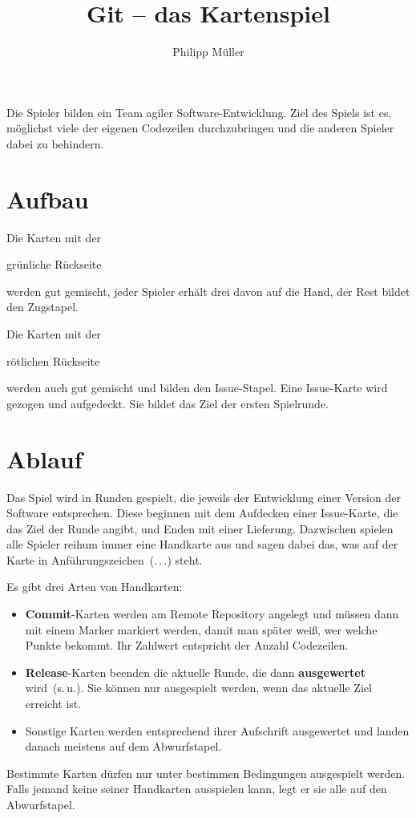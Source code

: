 \documentclass[DIV=15, fontsize=11pt]{scrartcl}
\title{Git -- das Kartenspiel}
\author{Philipp Müller}
\newcommand\hugefont[1]{\raisebox{-5pt}{\fontsize{50}{60}\sffamily\bfseries\selectfont #1}}
\newcommand\bigfont[1]{{\fontsize{20}{24}\sffamily\bfseries\selectfont #1}}
\newcommand\textfontsize[1]{\fontsize{9}{10}\sffamily\selectfont #1}
\newcommand\rede[1]{\glqq #1\grqq{}}
\newcommand\textrule[1]{\textbf{#1}}
\newenvironment{CardFront}[1]{%
  \global\advance\cardnum by 1%
  \begin{tikzpicture}
    \draw[line width=\cardlinewidth, rounded corners=\cardborderradius, fill=white] (0,0) rectangle (\cardwidth,\cardheight) coordinate (URex);

    \path (0,0)--(\cardwidth,\cardheight) coordinate[midway] (Center);
    \path (URex)--+(-\cardborder,-\cardborder) coordinate[midway] (URmed) coordinate (UR);
    \coordinate (ULex) at (0,\cardheight);
    \coordinate (LRex) at (\cardwidth,0);
    
    \fill[bgcolor, rounded corners=\cardborderradius] (\cardborder,\cardborder) coordinate (LL) rectangle (UR);
    
    \path (LL)-|(UR) coordinate[midway] (LR);
    \path (LL)|-(UR) coordinate[midway] (UL);
    \path (UL)--(ULex) coordinate[midway] (ULmed);
    \path (LL)-|(UR) coordinate[midway] (LR);
    \path (LL)--(0,0) coordinate[midway] (LLmed);
    \path (LR)--(LRex) coordinate[midway] (LRmed);

    \path (Center)+(0,0.075\cardheight) coordinate (UCenter);
	
	\path (UCenter)+(0,0.25\cardheight) node {\bigfont{#1}};
}{
  \end{tikzpicture}%
  \ifnum\cardnum>2
	\global\cardnum=0

	\vskip-1pt
  \fi
}
\newcommand\CardTextField[1]{%
    \path (UCenter)+(0,-0.25\cardwidth-0.015\cardheight) node[anchor=north] {%
	\begin{minipage}{\cardtextwidth}
		\textfontsize\rightskip0pt minus 0.25em
		#1
	\end{minipage}};
}
\newcommand\CardFrontTikzBase[3]{%
	\begin{CardFront}{#1}
		#2
		
		\CardTextField{#3}
	\end{CardFront}%
}
\newcommand\CardFrontTikzCircle[4]{%
	\CardFrontTikzBase{#1}{%
		\draw[line width=1.5pt, fill=#3] (UCenter) circle[radius=0.25*\cardwidth];
		#2}{#4}%
}
\newcommand\CalcNumberColor[1]{%
	\ifnum#1<0
		\colorlet{numcolor}{errorcolor}%
	\else%
		\ifnum#1<8%
			\auxnum=#1
			\ifnum#1=0\else\advance\auxnum by -1\fi%
			\multiply\auxnum by 14
			\colorlet{numcolor}{middlecolor!\the\auxnum!nullcolor}%
		\else%
			\ifnum#1<32
				\auxnum=#1
				\advance\auxnum by -8
				\multiply\auxnum by 42
				\divide\auxnum by 10
				\colorlet{numcolor}{highcolor!\the\auxnum!middlecolor}%
			\else%
				\colorlet{numcolor}{highcolor}%
			\fi%
		\fi%
	\fi%
%
	\auxnum=#1
	\ifnum\auxnum<0\else%
		\ifnum\auxnum<16
			\def\sixteen{white}%
		\else%
			\def\sixteen{black}%
			\advance\auxnum by -16
		\fi%
		\ifnum\auxnum<8
			\def\eight{white}%
		\else%
			\def\eight{black}%
			\advance\auxnum by -8
		\fi%
		\ifnum\auxnum<4
			\def\four{white}%
		\else%
			\def\four{black}%
			\advance\auxnum by -4
		\fi%
		\ifnum\auxnum<2
			\def\two{white}%
		\else%
			\def\two{black}%
			\advance\auxnum by -2
		\fi%
		\ifnum\auxnum<1%
			\def\one{white}%
		\else%
			\def\one{black}%
		\fi%
	\fi%
	\auxnum=#1
}
\newcommand\DrawNumber[1][]{
	\ifnum\auxnum<0
		\path (UCenter)+(0,0.025\cardwidth) node[anchor=center] {\hugefont{X}};
	\else
		\path (UCenter)+(0,0.025\cardwidth) node[anchor=center] {#1\hugefont{\number\auxnum}};
		\ifnum\auxnum<16
			\path (UCenter)++(-0.09*\cardwidth,-0.125*\cardwidth) coordinate (aux);
		\else
			\path (UCenter)++(-0.12*\cardwidth,-0.125*\cardwidth) coordinate (aux);
			\draw[fill=\sixteen] (aux) circle[radius=1mm];
			\path (aux)++(0.06*\cardwidth,0) coordinate (aux);
		\fi
		\draw[fill=\eight] (aux) circle[radius=1mm];
		\path (aux)++(0.06*\cardwidth,0) coordinate (aux);
		\draw[fill=\four] (aux) circle[radius=1mm];
		\path (aux)++(0.06*\cardwidth,0) coordinate (aux);
		\draw[fill=\two] (aux) circle[radius=1mm];
		\path (aux)++(0.06*\cardwidth,0) coordinate (aux);
		\draw[fill=\one] (aux) circle[radius=1mm];
	\fi
}
\newcommand\DrawNumberBorder{%
	\ifnum\auxnum<0\else%
		\node[draw, line width=1pt, fill=numcolor, circle, inner sep=0pt, anchor=north west] (ULborder) at (ULmed) {\hphantom{\bigfont{0}}\clap{\bigfont{\number\auxnum}}\hphantom{\bigfont{0}}};%
		\node[draw, line width=1pt, fill=numcolor, circle, inner sep=0pt, anchor=north east] (URborder) at (URmed) {\hphantom{\bigfont{0}}\clap{\bigfont{\number\auxnum}}\hphantom{\bigfont{0}}};%
	\fi
}
\newcommand\CardFrontCommit[2][\centering\rede{git push!}]{%
	\CalcNumberColor{#2}%
	\CardFrontTikzCircle{commit}{\DrawNumber\DrawNumberBorder}{numcolor}{#1}%
}
\begin{document}
\maketitle

Die Spieler bilden ein Team agiler Software-Entwicklung. Ziel des Spiels ist es, möglichst viele der eigenen Codezeilen durchzubringen und die anderen Spieler dabei zu behindern.



\section{Aufbau}\fboxsep=0pt
Die Karten mit der \colorbox{bgcolor1}{grünliche Rückseite\strut} werden gut gemischt, jeder Spieler erhält drei davon auf die Hand, der Rest bildet den Zugstapel.

Die Karten mit der \colorbox{bgcolor2}{rötlichen Rückseite\strut} werden auch gut gemischt und bilden den Issue-Stapel. Eine Issue-Karte wird gezogen und aufgedeckt. Sie bildet das Ziel der ersten Spielrunde.



\section{Ablauf}
Das Spiel wird in Runden gespielt, die jeweils der Entwicklung einer Version der Software entsprechen. Diese beginnen mit dem Aufdecken einer Issue-Karte, die das Ziel der Runde angibt, und Enden mit einer Lieferung. Dazwischen spielen alle Spieler reihum immer eine Handkarte aus und sagen dabei das, was auf der Karte in Anführungszeichen~(\rede{.\,.\,.}) steht.

Es gibt drei Arten von Handkarten:
\begin{itemize}
	\item \textrule{Commit}-Karten werden am Remote Repository angelegt und müssen dann mit einem Marker markiert werden, damit man später weiß, wer welche Punkte bekommt. Ihr Zahlwert entspricht der Anzahl Codezeilen.
	\item \textrule{Release}-Karten beenden die aktuelle Runde, die dann \textrule{ausgewertet} wird~(s.\,u.). Sie können nur ausgespielt werden, wenn das aktuelle Ziel erreicht ist.
	\item Sonstige Karten werden entsprechend ihrer Aufschrift ausgewertet und landen danach meistens auf dem Abwurfstapel.
\end{itemize}

Bestimmte Karten dürfen nur unter bestimmen Bedingungen ausgespielt werden. Falls jemand keine seiner Handkarten ausspielen kann, legt er sie alle auf den Abwurfstapel.
\end{document}
